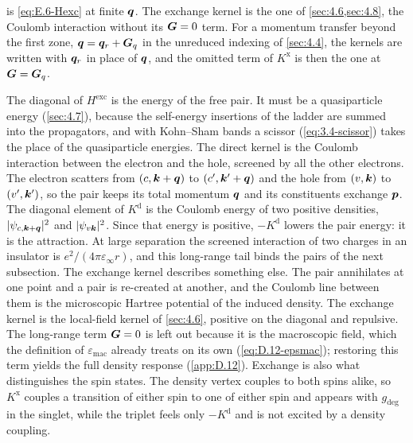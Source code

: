  is \cref{eq:E.6-Hexc} at finite $\bm{q}$. The exchange kernel is the one of \cref{sec:4.6,sec:4.8}, the Coulomb interaction without its $\bm{G} = 0$ term. For a momentum transfer beyond the first zone, $\bm{q} = \bm{q}_r + \bm{G}_q$ in the unreduced indexing of \cref{sec:4.4}, the kernels are written with $\bm{q}_r$ in place of $\bm{q}$, and the omitted term of $K^{\mathrm{x}}$ is then the one at $\bm{G} = \bm{G}_q$.

The diagonal of $H^{\mathrm{exc}}$ is the energy of the free pair. It must be a quasiparticle energy (\cref{sec:4.7}), because the self-energy insertions of the ladder are summed into the propagators, and with Kohn--Sham bands a scissor (\cref{eq:3.4-scissor}) takes the place of the quasiparticle energies. The direct kernel is the Coulomb interaction between the electron and the hole, screened by all the other electrons. The electron scatters from $(c,\bm{k}+\bm{q})$ to $(c',\bm{k}'+\bm{q})$ and the hole from $(v,\bm{k})$ to $(v',\bm{k}')$, so the pair keeps its total momentum $\bm{q}$ and its constituents exchange $\bm{p}$. The diagonal element of $K^{\mathrm{d}}$ is the Coulomb energy of two positive densities, $|\psi_{c,\bm{k}+\bm{q}}|^2$ and $|\psi_{v\bm{k}}|^2$. Since that energy is positive, $-K^{\mathrm{d}}$ lowers the pair energy: it is the attraction. At large separation the screened interaction of two charges in an insulator is $e^2/(4\pi\varepsilon_\infty r)$, and this long-range tail binds the pairs of the next subsection. The exchange kernel describes something else. The pair annihilates at one point and a pair is re-created at another, and the Coulomb line between them is the microscopic Hartree potential of the induced density. The exchange kernel is the local-field kernel of \cref{sec:4.6}, positive on the diagonal and repulsive. The long-range term $\bm{G} = 0$ is left out because it is the macroscopic field, which the definition of $\varepsilon_{\mathrm{mac}}$ already treats on its own (\cref{eq:D.12-epsmac}); restoring this term yields the full density response (\cref{app:D.12}). Exchange is also what distinguishes the spin states. The density vertex couples to both spins alike, so $K^{\mathrm{x}}$ couples a transition of either spin to one of either spin and appears with $g_{\mathrm{deg}}$ in the singlet, while the triplet feels only $-K^{\mathrm{d}}$ and is not excited by a density coupling.

